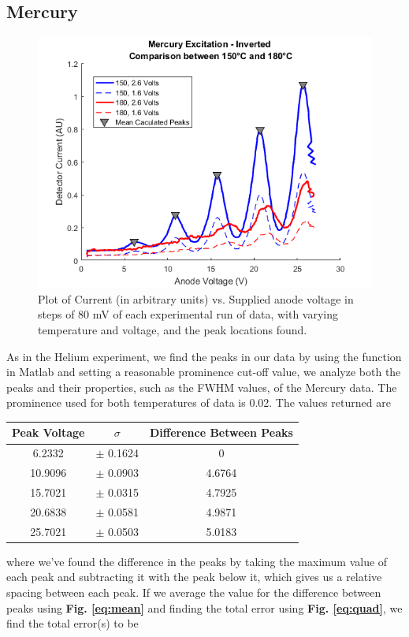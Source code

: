 \documentclass[%
 reprint,
 amsmath,amssymb,
 aps,
]{revtex4-1}
\begin{document}
\subsection{\label{sec:merana}Mercury}
\begin{figure}[!ht]\centering
\includegraphics[width = .5\textwidth,keepaspectratio]{peaksmer.png}
\caption{Plot of Current (in arbitrary units) vs. Supplied anode voltage in steps of 80 mV of each experimental run of data, with varying temperature and voltage, and the peak locations found.}
\label{fig:peak2}
\end{figure}
As in the Helium experiment, we  find the peaks in our data by using the \fp\cite{peak} function in Matlab and setting a reasonable prominence cut-off value, we analyze both the peaks and their properties, such as the FWHM values, of the Mercury data. The prominence used for both temperatures of data is 0.02. The values returned are


\begin{center}
\begin{tabular}{c  c  c  } Peak Voltage & $\sigma$ & Difference Between Peaks\\\hline
  6.2332   &$\pm$ 0.1624 &       0      \\
 10.9096  &$\pm$ 0.0903 & 4.6764 \\
  15.7021 &$\pm$ 0.0315 & 4.7925 \\
  20.6838 &$\pm$ 0.0581 & 4.9871 \\                 
  25.7021 &$\pm$ 0.0503 & 5.0183 \\
\end{tabular}
\end{center}

where we've found the difference in the peaks by taking the maximum value of each peak and subtracting it with the peak below it, which gives us a relative spacing between each peak.
If we average the value for the difference between peaks using \textbf{Fig. \ref{eq:mean}} and finding the total error using \textbf{Fig. \ref{eq:quad}}, we find the total error(s) to be
\end{document}
